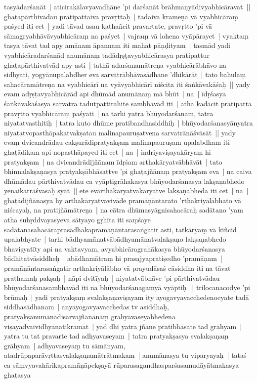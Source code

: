 \documentclass[article,a4paper]{memoir}
\newcommand{\persName}[1]{#1}
\begin{document}
tasyā\-darśanā\-t | aticirakā\-lavyavadhā\-ne 'pi darśanā\-t brā\-hmaṇyā\-divyabhicā\-ravat || \label{thakur75-108.18} ghaṭapā\-rthivā\-dau pratipattaiva pravṛttaḥ | tadaiva krameṇa vā\- vyabhicā\-raṃ paśyed iti cet | yadi tā\-vad asau kathañcit pravartate, pravṛtto 'pi vā\- sā\-magryabhā\-vā\-vyabhicā\-raṃ na paśyet | vajraṃ vā\- lohena vyā\-pā\-rayet | vyaktaṃ tasya tā\-vat tad apy amā\-nam ā\-pannam iti mahat pā\-ṇḍityam | tasmā\-d yadi vyabhicā\-radarśanā\-d anumā\-naṃ tadā\-dṛṣṭavyabhicā\-rasya pratipattur ghaṭapā\-rthivatvā\-d apy asti | tathā\- adarśanamā\-treṇa vyabhicā\-rā\-bhā\-vo na sidhyati, yogyā\-nupalabdher eva sarvatrā\-bhā\-vasā\-dhane 'dhikā\-rā\-t | tato bahulaṃ sahacā\-ramā\-treṇa na vyabhicā\-rī\- na vyā\-vyabhicā\-rī\- niścita iti śaṅkā\-vakā\-śaḥ || \label{thakur75-108.25} yady evam adṛṣṭavyabhicā\-rā\-d api dhū\-mā\-d anumā\-naṃ mā\- bhū\-t | na | ī\-dṛśasya śaṅkā\-vakā\-śasya sarvatra tadutpattirahite sambhavā\-d iti | atha kadā\-cit pratipattā\- pravṛtto vyabhicā\-raṃ paśyati | na tarhi yatra bhū\-yodarśanam, tatra niyatatvasthitiḥ | tatra kuto dhū\-me pratibandhasiddhiḥ | bhū\-yodarśanasyā\-nyatra niyatatvopasthā\-pakatvakṣatau malinapauruṣatvena sarvatrā\-nā\-śvā\-sā\-t || \label{thakur75-108.30} yady evaṃ dvicandrā\-dau cakṣurā\-dipratyakṣaṃ malinapauruṣam upalabdham iti ghaṭā\-dikam api nopasthā\-payed iti cet | na | indriyaviṣayakā\-ryaṃ hi pratyakṣam | na dvicandrā\-dijñā\-nam ī\-dṛśam arthakā\-ryatvā\-bhā\-vā\-t | tato bhinnalakṣaṇasya pratyakṣā\-bhā\-sattve 'pi ghaṭajñā\-naṃ pratyakṣam eva | na caiva dhū\-mā\-dau pā\-rthivatvā\-dau ca vyā\-ptigrā\-hakasya bhū\-yodarśanasya lakṣaṇabhedo yenaikatrā\-śvā\-saḥ syā\-t || \label{thakur75-109.4} ete evā\-rthakā\-ryatvā\-kā\-ryatve lakṣaṇabheda iti cet | na | ghaṭā\-dijñā\-nasya hy arthakā\-ryatvavivā\-de pramā\-ṇā\-ntarato 'rthakriyā\-lā\-bhato vā\- niścayaḥ, na pratijñā\-mā\-treṇa | na cā\-tra dhū\-masyā\-gnisahacā\-raḥ sadā\-tano 'yam atha suhṛddvayasyeva sā\-tyayo gṛhī\-ta iti saṃśaye sadā\-tanasahacā\-raprasā\-dhakapramā\-ṇā\-ntarasaṅgatir asti, tatkā\-ryaṃ vā\- kiñcid upalabhyate | tarhi bā\-dhyamā\-natvā\-bā\-dhyamā\-natvalakṣaṇo lakṣaṇabhedo bhaviṣyatī\-ty api na vaktavyam, avyabhicā\-ragrahā\-kasya bhū\-yodarśanasya bā\-dhitatvā\-siddheḥ | abā\-dhamā\-traṃ hi prasajyapratiṣedho 'pramā\-ṇam | pramā\-ṇā\-ntarasaṅgatir arthakriyā\-lā\-bho vā\- prayudā\-saś cā\-siddha iti na tā\-vat prathamaḥ pakṣaḥ | nā\-pi dvitī\-yaḥ | niyatatvā\-bhā\-ve 'pi pā\-rthivatvā\-dau bhū\-yodarśanasambhavā\-d iti na bhū\-yodarśanagamyā\- vyā\-ptiḥ || \label{thakur75-109.13} \persName{trilocana}codye 'pi brū\-maḥ | yadi pratyakṣaṃ svalakṣaṇaviṣayam ity ayogavyavacchedenocyate tadā\- siddhasā\-dhanam | anyayogavyavacchedas tv asiddhaḥ, pratyakṣā\-numā\-nā\-disarvajñā\-nā\-nā\-ṃ grā\-hyā\-vaseyabhedena viṣayadvaividhyā\-natikramā\-t | yad dhi yatra jñā\-ne pratibhā\-sate tad grā\-hyam | yatra tu tat pravarte tad adhyavaseyam | tatra pratyakṣasya svalakṣaṇaṃ grā\-hyam | adhyavaseyaṃ tu sā\-mā\-nyam, atadrū\-paparā\-vṛttasvalakṣaṇamā\-trā\-tmakam | anumā\-nasya tu viparyayaḥ | tataś ca sā\-ṃvyavahā\-rikapramā\-ṇā\-pekṣayā\- rū\-parasagandhasparśasamudā\-yā\-tmakasya ghaṭasya 
\end{document}
